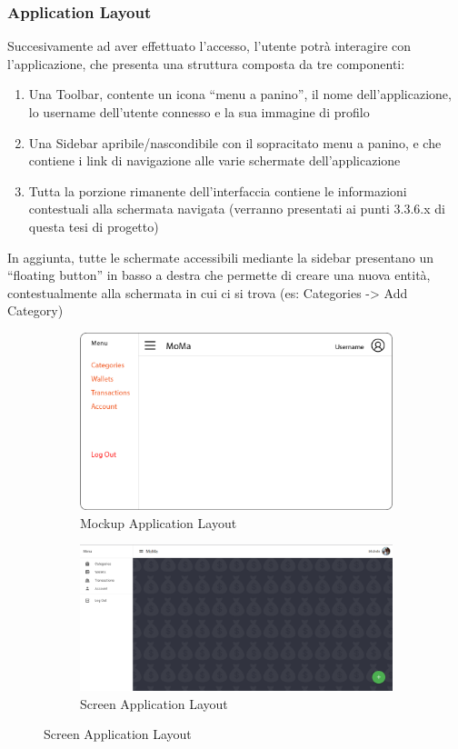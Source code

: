 \documentclass{report}
\begin{document}
\subsubsection{Application Layout}
Succesivamente ad aver effettuato l’accesso, l’utente potrà interagire con l’applicazione, che presenta una struttura composta da tre componenti:
\begin{enumerate}
    \item Una Toolbar, contente un icona “menu a panino”, il nome dell’applicazione, lo username dell’utente connesso e la sua immagine di profilo
    \item Una Sidebar apribile/nascondibile con il sopracitato menu a panino, e che contiene i link di navigazione alle varie schermate dell’applicazione
    \item Tutta la porzione rimanente dell’interfaccia contiene le informazioni contestuali alla schermata navigata (verranno presentati ai punti 3.3.6.x di questa tesi di progetto)
\end{enumerate}
In aggiunta, tutte le schermate accessibili mediante la sidebar presentano un “floating button” in basso a destra che permette di creare una nuova entità, contestualmente alla schermata in cui ci si trova (es: Categories -> Add Category)
\begin{figure}[H]
    \begin{subfigure}
        \centering
        \includegraphics[scale=0.3]{images/mockups/Application.png}
        \caption{Mockup Application Layout}
    \end{subfigure}
    \par\bigskip
    \begin{subfigure}
        \centering
        \includegraphics[scale=0.35]{images/screens/Application.png}
        \caption{Screen Application Layout}
    \end{subfigure}
\end{figure}
\end{document}

